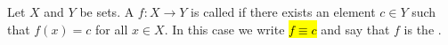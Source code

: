 \begin{definition} \label{definition:constant_function_on_a_set}
    Let $X$ and $Y$ be sets. A  $f : X \to Y$ is called  if there exists an element $c \in Y$ such that $f(x) = c$ for all $x \in X$. In this case we write \hl{$f \equiv c$} and say that $f$ is the .
\end{definition}